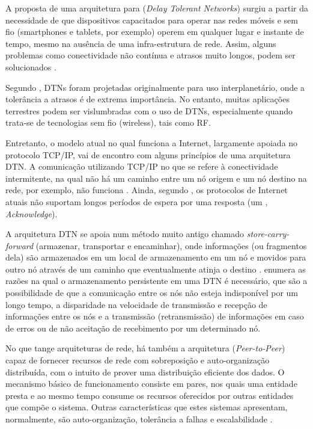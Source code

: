 A proposta de uma arquitetura para  (\emph{Delay Tolerant Networks}) surgiu a partir da necessidade de que dispositivos capacitados para operar nas redes móveis e sem fio (smartphones e tablets, por exemplo) operem em qualquer lugar e instante de tempo, mesmo na ausência de uma infra-estrutura de rede. Assim, alguns problemas como conectividade não contínua e atrasos muito longos, podem ser solucionados  \cite{vendramin2012c}.

Segundo , DTNs foram projetadas originalmente para uso interplanetário, onde a tolerância a atrasos é de extrema importância. No entanto, muitas aplicações terrestres podem ser vislumbradas com o uso de DTNs, especialmente quando trata-se de tecnologias sem fio (wireless), tais como RF.

Entretanto, o modelo atual no qual funciona a Internet, largamente apoiada no protocolo TCP/IP, vai de encontro com alguns princípios de uma arquitetura DTN. A comunicação utilizando TCP/IP no que se refere à conectividade intermitente, na qual não há um caminho entre um nó origem e um nó destino na rede, por exemplo, não funciona \cite{warthman}. Ainda, segundo , os protocolos de Internet atuais não suportam longos períodos de espera por uma resposta (um , \textit{Acknowledge}).

A arquitetura DTN se apoia num método muito antigo chamado \emph{store-carry-forward} (armazenar, transportar e encaminhar), onde informações (ou fragmentos dela) são armazenados em um local de armazenamento em um nó e movidos para outro nó através de um caminho que eventualmente atinja o destino \cite{warthman}.  enumera as razões na qual o armazenamento persistente em uma DTN é necessário, que são a possibilidade de que a comunicação entre os nós não esteja indisponível por um longo tempo, a disparidade na velocidade de transmissão e recepção de informações entre os nós e a transmissão (retransmissão) de informações em caso de erros ou de não aceitação de recebimento por um determinado nó.

No que tange arquiteturas de rede, há também a arquitetura  (\emph{Peer-to-Peer}) capaz de fornecer recursos de rede com sobreposição e auto-organização distribuída, com o intuito de prover uma distribuição eficiente dos dados. O mecanismo básico de funcionamento consiste em pares, nos quais uma entidade presta e ao mesmo tempo consume os recursos oferecidos por outras entidades que compõe o sistema. Outras características que estes sistemas apresentam, normalmente, são auto-organização, tolerância a falhas e escalabilidade \cite{italianos}.

